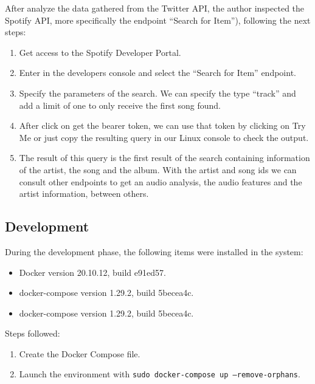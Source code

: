 \nonzeroparskip After analyze the data gathered from the Twitter API,  the author inspected the Spotify API, more specifically the endpoint ``Search for Item''), following the next steps:
\begin{enumerate}
	\item Get access to the Spotify Developer Portal.
	\item Enter in the developers console and select the ``Search for Item'' endpoint.
	\item Specify the parameters of the search. We can specify the type ``track'' and add a limit of one to only receive the first song found.
	\item After click on get the bearer token, we can use that token by clicking on Try Me or just copy the resulting query in our Linux console to check the output.
	\item The result of this query is the first result of the search containing information of the artist, the song and the album. With the artist and song ids we can consult other endpoints to get an audio analysis, the audio features and the artist information, between others.
\end{enumerate}

\subsection{Development}
\nonzeroparskip During the development phase, the following items were installed in the system:
\begin{itemize}
	\item Docker version 20.10.12, build e91ed57.
	\item docker-compose version 1.29.2, build 5becea4c.
	\item docker-compose version 1.29.2, build 5becea4c.
\end{itemize}

\nonzeroparskip Steps followed:
\begin{enumerate}
	\item Create the Docker Compose file.
	\item Launch the environment with \texttt{sudo docker-compose up --remove-orphans}.
\end{enumerate}

